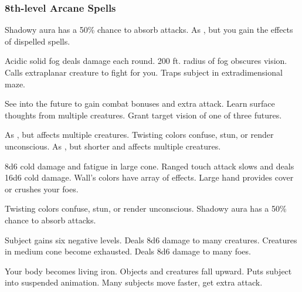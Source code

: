 \subsubsection{8th-level Arcane Spells} 
\begin{swspelllist}
     Shadowy aura has a 50\% chance to absorb attacks. 
   As , but you gain the effects of dispelled spells.

   Acidic solid fog deals damage each round.
   200 ft. radius of fog obscures vision.
   Calls extraplanar creature to fight for you.
   Traps subject in extradimensional maze.

   See into the future to gain combat bonuses and extra attack.
   Learn surface thoughts from multiple creatures.
   Grant target vision of one of three futures.

   As , but affects multiple creatures.
   Twisting colors confuse, stun, or render unconscious.
   As , but shorter and affects multiple creatures.

   8d6 cold damage and fatigue in large cone.
   Ranged touch attack slows and deals 16d6 cold damage.
   Wall's colors have array of effects.
   Large hand provides cover or crushes your foes.

   Twisting colors confuse, stun, or render unconscious.
     Shadowy aura has a 50\% chance to absorb attacks. 
  \spellheadrestricted{}

   Subject gains six negative levels.
   Deals 8d6 damage to many creatures.
   Creatures in medium cone become exhausted.
   Deals 8d6 damage to many foes.

   Your body becomes living iron.
   Objects and creatures fall upward.
  \M Puts subject into suspended animation.
   Many subjects move faster, get extra attack.
\end{swspelllist}

